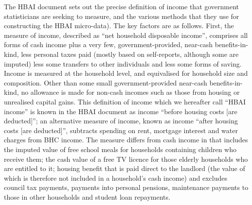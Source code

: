 The HBAI document sets out the precise definition of income that government statisticians are seeking to measure, and the various methods that they use for constructing the HBAI micro-data). The key factors are as follows. First, the measure of income, described as ``net household disposable income'', comprises all forms of cash income plus a very few, government-provided, near-cash benefits-in-kind, less personal taxes paid (mostly based on self-reports, although some are imputed) less some transfers to other individuals and less some forms of saving. Income is measured at the household level, and equivalised for household size and composition.  Other than some small government-provided near-cash benefits-in-kind, no allowance is made for non-cash incomes such as those from housing or unrealised capital gains. This definition of income which we hereafter call ``HBAI income'' is known in the HBAI document as income ``before housing costs [are deducted]''; an alternative measure of income, known as income ``after housing costs [are deducted]'', subtracts spending on rent, mortgage interest and water charges from BHC income. The measure differs from cash income in that includes the imputed value of free school meals for households containing children who receive them; the cash value of a free TV licence for those elderly households who are entitled to it; housing benefit that is paid direct to the landlord (the value of which is therefore not included in a household's cash income) and excludes council tax payments, payments into personal pensions, maintenance payments to those in other households and student loan repayments.


